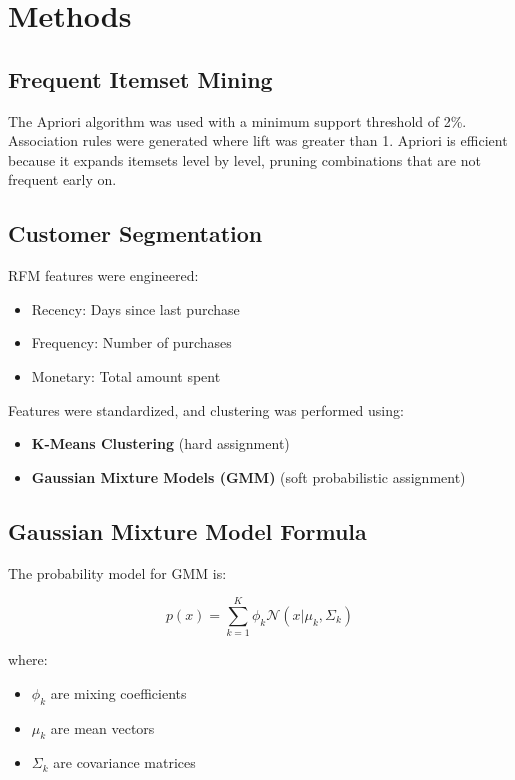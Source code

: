 \documentclass[12pt]{article}
\begin{document}
\section{Methods}

\subsection{Frequent Itemset Mining}

The Apriori algorithm was used with a minimum support threshold of 2\%.  
Association rules were generated where lift was greater than 1.  
Apriori is efficient because it expands itemsets level by level, pruning combinations that are not frequent early on.

\subsection{Customer Segmentation}

RFM features were engineered:
\begin{itemize}
    \item Recency: Days since last purchase
    \item Frequency: Number of purchases
    \item Monetary: Total amount spent
\end{itemize}

Features were standardized, and clustering was performed using:
\begin{itemize}
    \item \textbf{K-Means Clustering} (hard assignment)
    \item \textbf{Gaussian Mixture Models (GMM)} (soft probabilistic assignment)
\end{itemize}

\subsection{Gaussian Mixture Model Formula}

The probability model for GMM is:

\[
p(x) = \sum_{k=1}^{K} \phi_k \mathcal{N}(x | \mu_k, \Sigma_k)
\]

where:
\begin{itemize}
    \item \( \phi_k \) are mixing coefficients
    \item \( \mu_k \) are mean vectors
    \item \( \Sigma_k \) are covariance matrices
\end{itemize}
\end{document}

